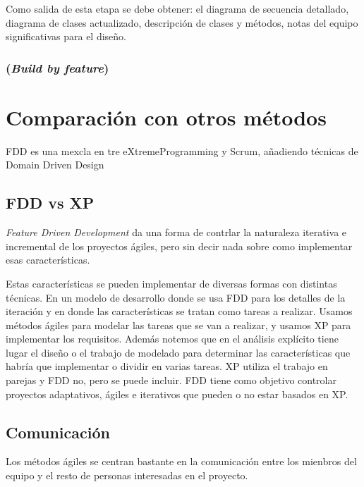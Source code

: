 \documentclass[11pt]{article}
\begin{document}
Como salida de esta etapa se debe obtener: el diagrama de secuencia detallado, diagrama de clases actualizado, descripción de clases y métodos, notas del equipo significativas para el diseño.

\subsubsection{(\textit{Build by feature})}



\section{Comparación con otros métodos}
FDD es una mexcla en tre eXtremeProgramming y Scrum, añadiendo técnicas de Domain Driven Design

\subsection*{FDD vs XP}
\textit{Feature Driven Development} da una forma de contrlar la naturaleza iterativa e incremental de los proyectos ágiles, pero sin decir nada sobre como implementar esas características.

Estas características se pueden implementar de diversas formas con distintas técnicas.
En un modelo de desarrollo donde se usa FDD para los detalles de la iteración y en donde las características se tratan como tareas a realizar.
Usamos métodos ágiles para modelar las tareas que se van a realizar, y usamos XP para implementar los requisitos. Además notemos que en el análisis explícito tiene lugar el diseño o el trabajo de modelado para determinar las características que habría que implementar o dividir en varias tareas. 
XP utiliza el trabajo en parejas y FDD no, pero se puede incluir. 
FDD tiene como objetivo controlar
proyectos adaptativos, ágiles e iterativos que pueden o no estar basados en XP.

\subsection*{Comunicación}
Los métodos ágiles se centran bastante en la comunicación entre los mienbros del equipo y el resto de personas interesadas en el proyecto.
\end{document}
